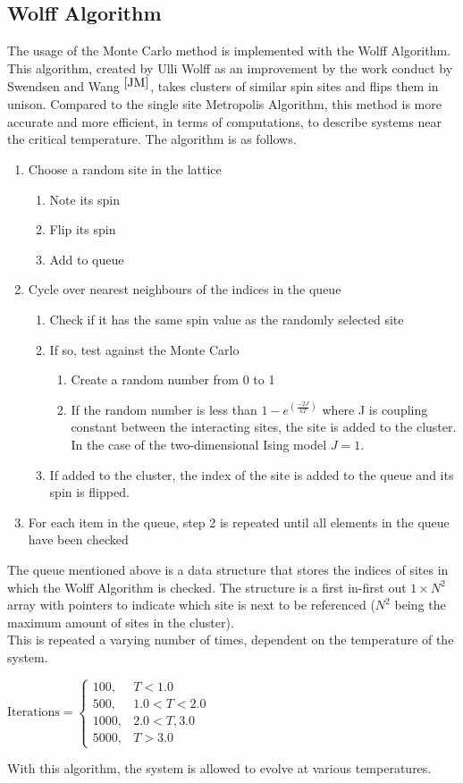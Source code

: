 \documentclass[letterpaper,12pt]{article}
\numberwithin{equation}{subsection}
\begin{document}
\subsection{Wolff Algorithm}
The usage of the Monte Carlo method is implemented with the Wolff Algorithm. This algorithm, created by Ulli Wolff as an improvement by the work conduct by Swendsen and Wang $^{\cite{JM}}$, takes clusters of similar spin sites and flips them in unison. Compared to the single site Metropolis Algorithm, this method is more accurate and more efficient, in terms of computations, to describe systems near the critical temperature. The algorithm is as follows.
\begin{enumerate}
\item Choose a random site in the lattice
	\begin{enumerate}
	\item Note its spin
	\item Flip its spin
	\item Add to queue
	\end{enumerate}
\item Cycle over nearest neighbours of the indices in the queue
	\begin{enumerate}
	\item Check if it has the same spin value as the randomly selected site
	\item If so, test against the Monte Carlo
		\begin{enumerate}
		\item Create a random number from 0 to 1
		\item If the random number is less than $1-e^{(\frac{-2J}{kT})}$ where J is coupling constant between the interacting sites, the site is added to the cluster. In the case of the two-dimensional Ising model $J = 1$.
		\end{enumerate}
	\item If added to the cluster, the index of the site is added to the queue and its spin is flipped.
	\end{enumerate}
\item For each item in the queue, step 2 is repeated until all elements in the queue have been checked
	\end{enumerate}
The queue mentioned above is a data structure that stores the indices of sites in which the Wolff Algorithm is checked. The structure is a first in-first out $1 \times N^2$ array with pointers to indicate which site is next to be referenced ($N^2$ being the maximum amount of sites in the cluster).\\
\indent This is repeated a varying number of times, dependent on the temperature of the system.
\begin{center}
$ \text{Iterations} = 
	\begin{cases}
		100,& T<1.0\\
		500,& 1.0<T<2.0\\
		1000,& 2.0<T,3.0\\
		5000,& T>3.0
	\end{cases} $
\end{center} 
With this algorithm, the system is allowed to evolve at various temperatures.
\end{document}
